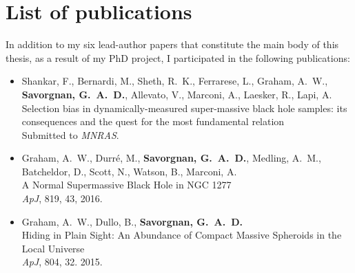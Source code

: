 \chapter*{List of publications}

In addition to my six lead-author papers that constitute the main body of this thesis, 
as a result of my PhD project, I participated in the following publications: 

\begin{itemize}

\item Shankar, F., Bernardi, M., Sheth, R.~K., Ferrarese, L., Graham, A.~W.,
      {\bf Savorgnan, G.~A.~D.}, Allevato, V., Marconi, A., Laesker, R., Lapi, A. \\
      Selection bias in dynamically-measured super-massive black hole samples: 
      its consequences and the quest for the most fundamental relation \\
      Submitted to \emph{MNRAS}. \\

\item Graham, A.~W., Durr\'e, M., {\bf Savorgnan, G.~A.~D.}, Medling, A.~M., 
      Batcheldor, D., Scott, N., Watson, B., Marconi, A. \\
      A Normal Supermassive Black Hole in NGC 1277 \\
      \emph{ApJ}, 819, 43, 2016. \\

\item Graham, A.~W., Dullo, B., {\bf Savorgnan, G.~A.~D.} \\
      Hiding in Plain Sight: An Abundance of Compact Massive Spheroids in the Local Universe \\
      \emph{ApJ}, 804, 32. 2015. \\ 

\end{itemize}
